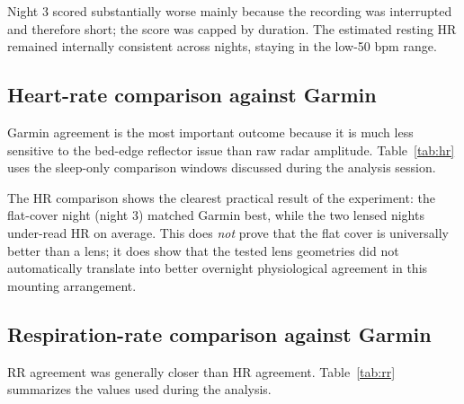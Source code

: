 \documentclass[11pt,a4paper]{article}
\begin{document}
Night 3 scored substantially worse mainly because the recording was interrupted and therefore short; the score was capped by duration. The estimated resting HR remained internally consistent across nights, staying in the low-50 bpm range.

\subsection{Heart-rate comparison against Garmin}
Garmin agreement is the most important outcome because it is much less sensitive to the bed-edge reflector issue than raw radar amplitude. Table~\ref{tab:hr} uses the sleep-only comparison windows discussed during the analysis session.

\begin{table}[H]
\centering
\caption{Sleep-only heart-rate comparison between radar and Garmin.}
\label{tab:hr}
\end{table}

The HR comparison shows the clearest practical result of the experiment: the flat-cover night (night 3) matched Garmin best, while the two lensed nights under-read HR on average. This does \emph{not} prove that the flat cover is universally better than a lens; it does show that the tested lens geometries did not automatically translate into better overnight physiological agreement in this mounting arrangement.

\subsection{Respiration-rate comparison against Garmin}
RR agreement was generally closer than HR agreement. Table~\ref{tab:rr} summarizes the values used during the analysis.
\end{document}
